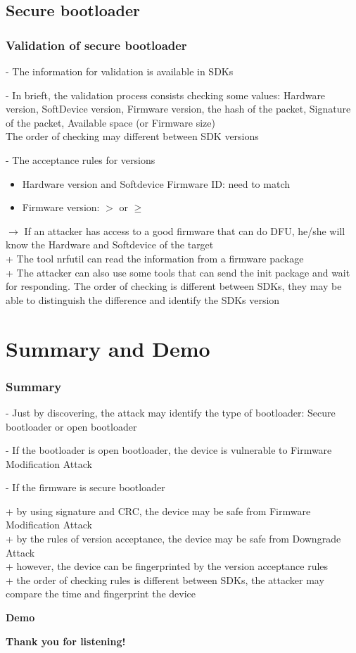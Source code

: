 \documentclass[34pt]{beamer}
\begin{document}
	\subsection{Secure bootloader}
	\begin{frame}
		\frametitle{Validation of secure bootloader}
		- The information for validation is available in SDKs
		
		\vspace{0.3cm}
		- In brieft, the validation process consists checking some values: Hardware version, SoftDevice version, Firmware version, the hash of the	packet, Signature of the packet, Available space (or Firmware size)\\
		The order of checking may different between SDK versions
		
		\vspace{0.3cm}
		- The acceptance rules for versions
		\begin{itemize}
			\item Hardware version and Softdevice Firmware ID: need to match
			\item Firmware version: $ > $ or $ \geq $
		\end{itemize}

\vspace{0.3cm}
\pause$ \longrightarrow $ If an attacker has access to a good firmware that can do DFU, he/she will know the Hardware and Softdevice of the target\\
+ The tool nrfutil can read the information from a firmware package\\
+ The attacker can also use some tools that can send the init package and wait for responding. The order of checking is different between SDKs, they may be able to distinguish the difference and identify the SDKs version
	\end{frame}

	\section{Summary and Demo}
	\begin{frame}
		\frametitle{Summary}
		\pause- Just by discovering, the attack may identify the type of bootloader: Secure bootloader or open bootloader
		
		\vspace{0.5cm}
		\pause- If the bootloader is open bootloader, the device is vulnerable to Firmware Modification Attack
		
		\vspace{0.5cm}
		\pause- If the firmware is secure bootloader
		
		+ by using signature and CRC, the device may be safe from Firmware Modification Attack\\
		+ by the rules of version acceptance, the device may be safe from Downgrade Attack\\
		+ however, the device can be fingerprinted by the version acceptance rules\\
		+ the order of checking rules is different between SDKs, the attacker may compare the time and fingerprint the device
	\end{frame}
	
	\begin{frame}
		\centering\bf \Huge Demo
	\end{frame}
	
	
	
	\begin{frame}
		\centering\bf \Huge Thank you for listening!
	\end{frame}
\end{document}
